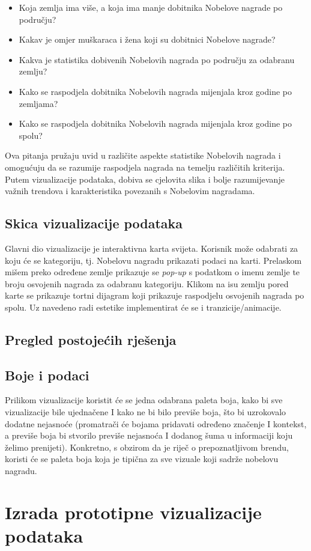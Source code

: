 \documentclass[12pt]{article}
\numberwithin{equation}{section}
\begin{document}
\begin{itemize}
\item Koja zemlja ima više, a koja ima manje dobitnika Nobelove nagrade po području?
\item Kakav je omjer muškaraca i žena koji su dobitnici Nobelove nagrade?
\item Kakva je statistika dobivenih Nobelovih nagrada po području za odabranu zemlju?
\item Kako se raspodjela dobitnika Nobelovih nagrada mijenjala kroz godine po zemljama?
\item Kako se raspodjela dobitnika Nobelovih nagrada mijenjala kroz godine po spolu?
\end{itemize}
Ova pitanja pružaju uvid u različite aspekte statistike Nobelovih nagrada i omogućuju da se razumije raspodjela nagrada na temelju različitih kriterija. Putem vizualizacije podataka, dobiva se cjelovita slika i bolje razumijevanje važnih trendova i karakteristika povezanih s Nobelovim nagradama.
\subsection{Skica vizualizacije podataka}
Glavni dio vizualizacije je interaktivna karta svijeta. Korisnik može odabrati za koju će se kategoriju, tj. Nobelovu nagradu prikazati podaci na karti. Prelaskom mišem preko određene zemlje prikazuje se \textit{pop-up} s podatkom o imenu zemlje te broju osvojenih nagrada za odabranu kategoriju. Klikom na isu zemlju pored karte se prikazuje tortni dijagram koji prikazuje raspodjelu osvojenih nagrada po spolu. Uz navedeno radi estetike implementirat će se i tranzicije/animacije.
\subsection{Pregled postojećih rješenja}
\subsection{Boje i podaci}
Prilikom vizualizacije koristit će se jedna odabrana paleta boja, kako bi sve vizualizacije bile ujednačene I kako ne bi bilo previše boja, što bi uzrokovalo dodatne nejasnoće (promatrači će bojama pridavati određeno značenje I kontekst, a previše boja bi stvorilo previše nejasnoća I dodanog šuma u informaciji koju želimo prenijeti). Konkretno, s obzirom da je riječ o prepoznatljivom brendu, koristi će se paleta boja koja je tipična za sve vizuale koji sadrže nobelovu nagradu.
\newpage
\section{Izrada prototipne vizualizacije podataka}
\end{document}
